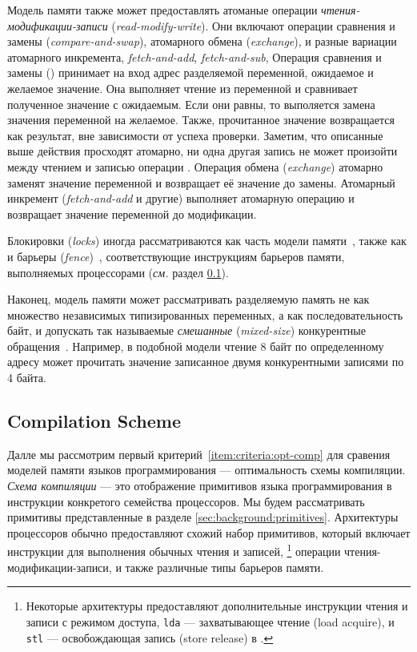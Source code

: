 Модель памяти также может предоставлять атоманые операции 
\emph{чтения-модификации-записи} (\emph{read-modify-write}).
Они включают операции сравнения и замены (\emph{compare-and-swap}), 
атомарного обмена (\emph{exchange}), и разные вариации атомарного инкремента, 
\eg \emph{fetch-and-add}, \emph{fetch-and-sub}, \etc 
Операция сравнения и замены (\CAS) принимает на вход 
адрес разделяемой переменной, ожидаемое и желаемое значение.
Она выполняет чтение из переменной и сравнивает полученное значение 
с ожидаемым. Если они равны, то выполяется замена значения переменной 
на желаемое. Также, прочитанное значение возвращается как результат, 
вне зависимости от успеха проверки. 
Заметим, что описанные выше действия просходят атомарно, 
ни одна другая запись не может произойти между 
чтением и записью операции \CAS.
Операция обмена (\emph{exchange}) атомарно 
заменят значение переменной и возвращает её 
значение до замены. 
Атомарный инкремент (\emph{fetch-and-add} и другие) выполняет
атомарную операцию и возвращает значение переменной до модификации.  

Блокировки (\emph{locks}) иногда рассматриваются 
как часть модели памяти~\cite{Manson-al:POPL05}, 
также как и барьеры (\emph{fence})~\cite{Batty-al:POPL11},
соответствующие инструкциям барьеров памяти, 
выполняемых процессорами  
(\emph{см.} раздел \cref{sec:background:compile}). 

Наконец, модель памяти может рассматривать разделяемую память 
не как множество независимых типизированных переменных, 
а как последовательность байт, и допускать 
так называемые \emph{смешанные} (\emph{mixed-size}) 
конкурентные обращения~\cite{Flur-al:POPL17}. 
Например, в подобной модели чтение 8 байт по определенному адресу
может прочитать значение записанное двумя конкурентными 
записями по 4 байта.

\subsection{Compilation Scheme}
\label{sec:background:compile}

Далле мы рассмотрим первый критерий~\ref{item:criteria:opt-comp}
для сравения моделей памяти языков программирования --- 
оптимальность схемы компиляции. 
\emph{Схема компиляции} --- это отображение
примитивов языка программирования в инструкции 
конкретого семейства процессоров.  
Мы будем рассматривать примитивы представленные в 
разделе \cref{sec:background:primitives}.
Архитектуры процессоров обычно предоставляют 
схожий набор примитивов, который включает 
инструкции для выполнения обычных чтения и записей,%
\footnote{Некоторые архитектуры
предоставляют дополнительные инструкции чтения и 
записи с режимом доступа, \eg 
\eg \texttt{lda} --- захватывающее чтение (load acquire), 
и \texttt{stl} --- освобождающая запись (store release) в .} 
операции чтения-модификации-записи, и 
также различные типы барьеров памяти.


